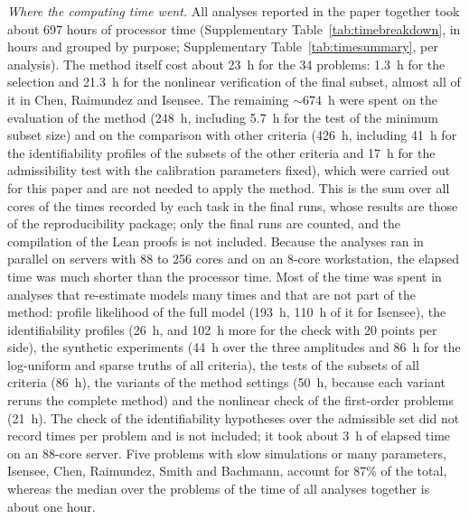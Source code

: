 \emph{Where the computing time went.} All analyses reported in the paper together took about 697 hours of processor time (Supplementary Table~\ref{tab:timebreakdown}, in hours and grouped by purpose; Supplementary Table~\ref{tab:timesummary}, per analysis). The method itself cost about 23~h for the 34 problems: 1.3~h for the selection and 21.3~h for the nonlinear verification of the final subset, almost all of it in Chen, Raimundez and Isensee. The remaining ${\sim}674$~h were spent on the evaluation of the method (248~h, including 5.7~h for the test of the minimum subset size) and on the comparison with other criteria (426~h, including 41~h for the identifiability profiles of the subsets of the other criteria and 17~h for the admissibility test with the calibration parameters fixed), which were carried out for this paper and are not needed to apply the method. This is the sum over all cores of the times recorded by each task in the final runs, whose results are those of the reproducibility package; only the final runs are counted, and the compilation of the Lean proofs is not included. Because the analyses ran in parallel on servers with 88 to 256 cores and on an 8-core workstation, the elapsed time was much shorter than the processor time. Most of the time was spent in analyses that re-estimate models many times and that are not part of the method: profile likelihood of the full model (193~h, 110~h of it for Isensee), the identifiability profiles (26~h, and 102~h more for the check with 20 points per side), the synthetic experiments (44~h over the three amplitudes and 86~h for the log-uniform and sparse truths of all criteria), the tests of the subsets of all criteria (86~h), the variants of the method settings (50~h, because each variant reruns the complete method) and the nonlinear check of the first-order problems (21~h). The check of the identifiability hypotheses over the admissible set did not record times per problem and is not included; it took about 3~h of elapsed time on an 88-core server. Five problems with slow simulations or many parameters, Isensee, Chen, Raimundez, Smith and Bachmann, account for 87\% of the total, whereas the median over the problems of the time of all analyses together is about one hour.

{\small

}

{\scriptsize\setlength{\tabcolsep}{3pt}

}

{\scriptsize\setlength{\tabcolsep}{3pt}

}

{\scriptsize\setlength{\tabcolsep}{3pt}

}

{\scriptsize\setlength{\tabcolsep}{3pt}

}

{\scriptsize\setlength{\tabcolsep}{3pt}

}
